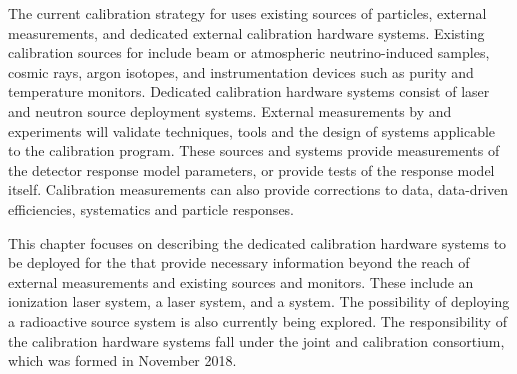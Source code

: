 The current calibration strategy for  uses existing sources of particles, external measurements, and dedicated external calibration hardware systems. Existing calibration sources for  include beam or atmospheric neutrino-induced samples, cosmic rays, argon isotopes, and instrumentation devices such as \lar purity and temperature monitors. Dedicated calibration hardware systems consist of laser  and neutron source deployment systems.  External measurements by  and  experiments  will validate techniques, tools and the design of systems applicable to the  calibration program. These sources and systems provide measurements of the detector response model parameters, or provide tests of the response model itself. Calibration measurements can also provide corrections to data, data-driven efficiencies, systematics and particle responses.


This chapter focuses on describing the dedicated calibration hardware systems to be deployed for the   that provide necessary information beyond the reach of external measurements and existing sources and monitors. These include an ionization laser system, a \phel laser system, and a  system. The possibility of deploying a radioactive source system is also currently being explored. The responsibility of the calibration hardware systems fall under the joint  and  calibration consortium, which was formed in November 2018.


